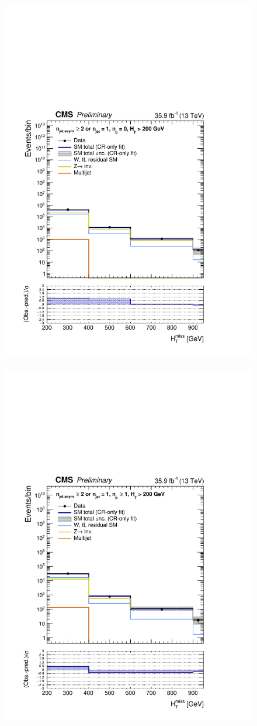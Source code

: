 \begin{figure}[h!]
  \centering
  \caption{
  }
  \includegraphics[width=0.49\linewidth]{figures/results/36invfb_preapproval/aggregated/postFitShapeCR/mhtShape_eq0b_ge1j2a_200_Inf_crfit.pdf} ~
  \includegraphics[width=0.49\linewidth]{figures/results/36invfb_preapproval/aggregated/postFitShapeCR/mhtShape_ge1b_ge1j2a_200_Inf_crfit.pdf} 
  \label{fig:aggregated_results1}
\end{figure}

